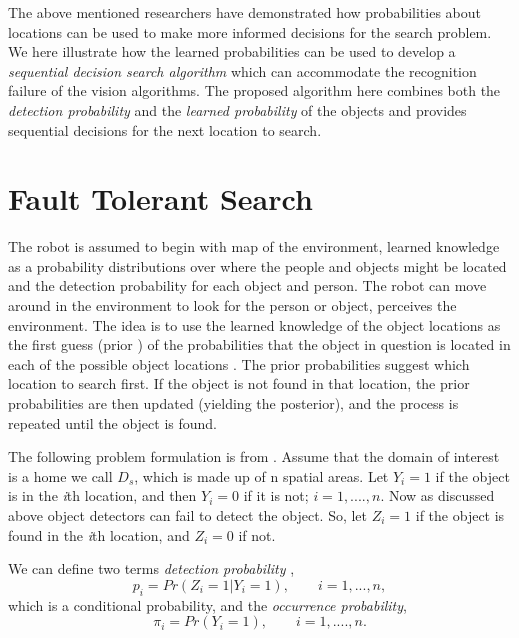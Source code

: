 The above mentioned researchers have demonstrated how probabilities about locations can be used to make more informed decisions for the search problem. We here illustrate how the learned probabilities can be used to develop a \emph{sequential decision search algorithm} which can accommodate the recognition failure of the vision algorithms. The proposed algorithm here combines both the \emph{detection probability} and the \emph{learned probability} of the objects and provides sequential decisions for the next location to search.

\section{Fault Tolerant Search}

The robot is assumed to begin with map of the environment, learned knowledge as a probability distributions over where the people and objects might be located and the detection probability for each object and person. The robot can move around in the environment to look for the person or object, perceives the environment. 
The idea is to use the learned knowledge of the object locations as the first guess (prior ) of the probabilities that the object in question is located in each of the possible object locations \citep{cressie2015statistics}. The prior probabilities suggest which location to search first. If the object is not found in that location, the prior probabilities are then updated (yielding the posterior), and the process is repeated until the object is found. 

The following problem formulation is from \cite[p. 25]{cressie2015statistics}.
Assume that the domain of interest is a home we call $D_s$, which is made up of n spatial areas. Let $Y_i = 1$ if the object is in the \emph{i}th location, and then $Y_i = 0$ if it is not; $ i = 1, .... , n$. Now as discussed above object detectors can fail to detect the object. So, let $Z_i = 1$ if the object is found in the \emph{i}th location, and $Z_i = 0$ if not.

We can define two terms \emph{detection probability} ,
\begin{equation}
	p_i = Pr(Z_i = 1| Y_i =1), \qquad  i = 1,...,n,
\end{equation}
which is a conditional probability, and the \emph{occurrence probability},
\begin{equation}
	\pi_i = Pr(Y_i = 1),\qquad  i = 1, .... , n.
\end{equation}

